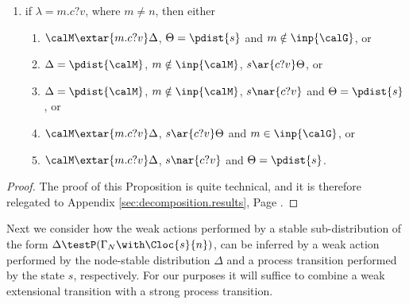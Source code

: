 \documentclass{LMCS}
\begin{document}
\begin{prop}
\begin{enumerate}
		\item if $\lambda = m.c?v$, where $m\neq n$, then either 
		 \begin{enumerate}[label=(\roman*)]
		 \item $\calM \extar{m.c?v} \Delta$, $\Theta = \pdist{s}$ 
		 and $m \notin \inp{\calG}$, or
		 \item $\Delta = \pdist{\calM}$, $m \notin \inp{\calM}$, $s \ar{c?v} \Theta$, or 
		 \item $\Delta = \pdist{\calM}$, $m \notin \inp{\calM}$, $s \nar{c?v}$ 
		 and $\Theta = \pdist{s}$, or
		 \item $\calM \extar{m.c?v} \Delta$, $s \ar{c?v} \Theta $ 
		 and $m \in \inp{\calG}$, or  
		 \item $\calM \extar{m.c?v} \Delta$, $s \nar{c?v}$ and $\Theta = \pdist{s}$.
		 \end{enumerate}
		\end{enumerate}
\end{prop}
\begin{proof}
  The proof of this Proposition is quite technical, and it is 
  therefore relegated to Appendix \ref{sec:decomposition.results}, Page \pageref{proof:decomp}.
\end{proof}

Next we consider how the weak actions performed by a stable sub-distribution of the form $\Delta 
\testP (\Gamma_N \with \Cloc{s}{n})$, can be inferred by a weak action performed by 
the node-stable distribution $\Delta$ and a process transition performed by the 
state $s$, respectively. 
For our purposes it will suffice to combine a weak extensional transition with 
a strong process transition.
\end{document}
